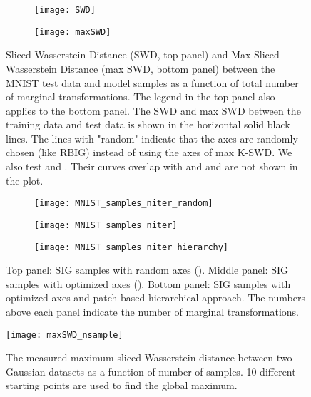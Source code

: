 \documentclass{article}
\begin{document}
\begin{figure}[htb]
     \centering
     \begin{subfigure}[b]{\linewidth}
         \centering
         \texttt{[image: SWD]}
     \end{subfigure}
     \hfill
     \begin{subfigure}[b]{\linewidth}
         \centering
         \texttt{[image: maxSWD]}
     \end{subfigure}
     \caption{Sliced Wasserstein Distance (SWD, top panel) and Max-Sliced Wasserstein Distance (max SWD, bottom panel) between the MNIST test data and model samples as a function of total number of marginal transformations. The legend in the top panel also applies to the bottom panel. The SWD and max SWD between the training data and test data is shown in the horizontal solid black lines. The lines with "random" indicate that the axes are randomly chosen (like RBIG) instead of using the axes of max K-SWD. We also test  and . Their curves overlap with  and  and are not shown in the plot.}
     \label{fig:convergence}
     \vskip -0.15in
\end{figure}

\begin{figure}[htb]
     \centering
     \begin{subfigure}[b]{\linewidth}
         \centering
         \texttt{[image: MNIST\_samples\_niter\_random]}
     \end{subfigure}
     \hfill
     \begin{subfigure}[b]{\linewidth}
         \centering
         \texttt{[image: MNIST\_samples\_niter]}
     \end{subfigure}
     \begin{subfigure}[b]{\linewidth}
         \centering
         \texttt{[image: MNIST\_samples\_niter\_hierarchy]}
     \end{subfigure}
    \caption{Top panel: SIG samples with random axes (). Middle panel: SIG samples with optimized axes (). Bottom panel: SIG samples with optimized axes and patch based hierarchical approach. The numbers above each panel indicate the number of marginal transformations.}
    \label{fig:ablation}
\end{figure}

\begin{figure}[htb]
     \centering
     \texttt{[image: maxSWD\_nsample]}
     \caption{The measured maximum sliced Wasserstein distance between two Gaussian datasets as a function of number of samples. 10 different starting points are used to find the global maximum.}
    \label{fig:maxSWD_nsample}
    \vskip -0.10in
\end{figure}
\end{document}
